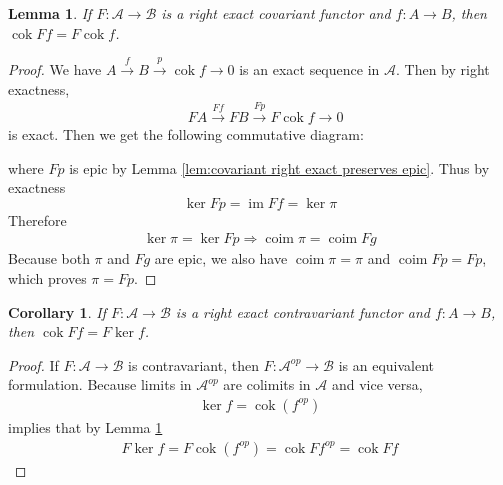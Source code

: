 \documentclass{article}
\newcommand{\fA}{\mathscr{A}}
\newcommand{\fB}{\mathscr{B}}
\DeclareMathOperator{\im}{im}
\DeclareMathOperator{\coim}{coim}
\DeclareMathOperator{\cok}{cok}
\newtheorem{corollary}{Corollary}[theorem]
\newtheorem{lemma}[theorem]{Lemma}
\begin{document}
\begin{lemma}\label{lem:covariant right exact commutes with cok}
    If $F:\fA \to \fB$ is a right exact covariant functor and $f:A\to B$, then $\cok Ff=F\cok f$.
\end{lemma}
\begin{proof}
    We have $A\xrightarrow{f}B \xrightarrow{p}\cok f\rightarrow 0$ is an exact sequence in $\fA$. Then by right exactness,
    \begin{align*}
        &FA \xrightarrow{Ff} FB\xrightarrow{Fp}F\cok f\rightarrow0
    \end{align*}
    is exact. Then we get the following commutative diagram:
    \begin{center}
    \end{center}
    where $Fp$ is epic by Lemma \ref{lem:covariant right exact preserves epic}. Thus by exactness
    \[
    \ker Fp=\im Ff=\ker \pi
    \]
    Therefore
    \begin{align*}
        \ker \pi=\ker Fp\Rightarrow \coim \pi=\coim Fg
    \end{align*}
    Because both $\pi$ and $Fg$ are epic, we also have $\coim \pi=\pi$ and $\coim Fp=Fp$, which proves $\pi=Fp$.
\end{proof}
\begin{corollary}\label{cor:contravariant right exact and ker to cok}
    If $F:\fA \to \fB$ is a right exact contravariant functor and $f:A\to B$, then $\cok Ff=F\ker f$.
\end{corollary}
\begin{proof}
    If $F:\fA \to \fB$ is contravariant, then $F:\fA^{op}\to \fB$ is an equivalent formulation. Because limits in $\fA^{op}$ are colimits in $\fA$ and vice versa,
    \begin{align*}
        \ker f=\cok (f^{op})
    \end{align*}
    implies that by Lemma \ref{lem:covariant right exact commutes with cok}
    \begin{align*}
        F\ker f=F\cok (f^{op})=\cok Ff^{op}=\cok Ff
    \end{align*}
\end{proof}
\end{document}
